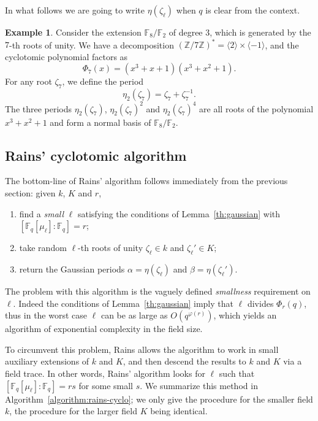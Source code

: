 \documentclass[12pt]{article}
\theoremstyle{plain}
\theoremstyle{definition}
\newtheorem{example}[theorem]{Example}
\def\Z{\ensuremath{\mathbb{Z}}}
\def\F{\ensuremath{\mathbb{F}}}
\def\euler{\ensuremath{\varphi}}
\newcounter{algorithm}
\begin{document}
In what follows we are going to write $\eta(\zeta_\ell)$ when $q$ is
clear from the context.

\begin{example} 
  Consider the extension $\F_8/\F_2$ of degree $3$, which is generated
  by the $7$-th roots of unity. We have a decomposition
  $(\Z/7\Z)^\ast=\langle 2\rangle\times\langle-1\rangle$, and the
  cyclotomic polynomial factors as
  \begin{equation}
    \Phi_7(x) = (x^3 + x + 1) (x^3 + x^2 + 1).
  \end{equation}
  For any root $\zeta_7$, we define the period
  \begin{equation}
    \eta_2(\zeta_7) = \zeta_7+\zeta_7^{-1}.
  \end{equation}
  The three periods $\eta_2(\zeta_7)$, $\eta_2(\zeta_7)^2$ and
  $\eta_2(\zeta_7)^4$ are all roots of the polynomial $x^3+x^2+1$ and
  form a normal basis of $\F_8/\F_2$.
\end{example}

\subsection{Rains' cyclotomic algorithm}

The bottom-line of Rains' algorithm follows immediately from the
previous section: given $k$, $K$ and $r$,
\begin{enumerate}
\item find a \emph{small} $\ell$ satisfying the conditions of
  Lemma~\ref{th:gaussian} with $[\F_q[\mu_\ell]:\F_q]=r$;
\item take random $\ell$-th roots of unity $\zeta_\ell\in k$ and
  $\zeta_\ell'\in K$;
\item return the Gaussian periods $\alpha=\eta(\zeta_\ell)$ and
  $\beta=\eta(\zeta_\ell')$.
\end{enumerate}

The problem with this algorithm is the vaguely defined
\emph{smallness} requirement on $\ell$. Indeed the conditions of
Lemma~\ref{th:gaussian} imply that $\ell$ divides $\Phi_r(q)$, thus in
the worst case $\ell$ can be as large as $O(q^{\euler(r)})$, which
yields an algorithm of exponential complexity in the field size.

To circumvent this problem, Rains allows the algorithm to work in
small auxiliary extensions of $k$ and $K$, and then descend the
results to $k$ and $K$ via a field trace. In other words, Rains'
algorithm looks for $\ell$ such that $[\F_q[\mu_\ell]:\F_q]=rs$ for
some small $s$. We summarize this method in
Algorithm~\ref{algorithm:rains-cyclo}; we only give the procedure for
the smaller field $k$, the procedure for the larger field $K$ being
identical.
\end{document}
